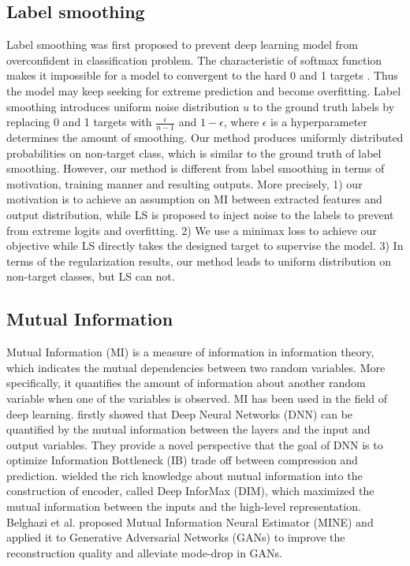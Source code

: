 \documentclass{article}
\theoremstyle{definition}
\begin{document}
\subsection{Label smoothing}
Label smoothing \cite{szegedy2016rethinking} was first proposed to prevent deep learning model from overconfident in classification problem. The characteristic of softmax function makes it impossible for a model to convergent to the hard 0 and 1 targets \cite{Goodfellow-et-al-2016}. Thus the model may keep seeking for extreme prediction and become overfitting. Label smoothing introduces uniform noise distribution $u$ to the ground truth labels by replacing 0 and 1 targets with $\frac{\epsilon}{n-1}$ and $1-\epsilon$, where $\epsilon$ is a hyperparameter determines the amount of smoothing. Our method produces uniformly distributed probabilities on non-target class, which is similar to the ground truth of label smoothing. However, our method is different from label smoothing in terms of motivation, training manner and resulting outputs. 
More precisely, 1) our motivation is to achieve an assumption on MI between extracted features and output distribution, while LS is proposed to inject noise to the labels to prevent from extreme logits and overfitting.
2) We use a minimax loss to achieve our objective while LS directly takes the designed target to supervise the model.
3) In terms of the regularization results, our method leads to uniform distribution on non-target classes, but LS can not.

\subsection{Mutual Information}
Mutual Information (MI) is a measure of information in information theory, which indicates the mutual dependencies between two random variables. More specifically, it quantifies the amount of information about another random variable when one of the variables is observed. 
MI has been used in the field of deep learning. 
\cite{tishby2015deep} firstly showed that Deep Neural Networks (DNN) can be quantified by the mutual information between the layers and the input and output variables. They provide a novel perspective that the goal of DNN is to optimize Information Bottleneck (IB) trade off between compression and prediction. 
\cite{hjelm2018learning} wielded the rich knowledge about mutual information into the construction of encoder, called Deep InforMax (DIM), which maximized the mutual information between the inputs and the high-level representation. Belghazi et al. \cite{belghazi2018mutual} proposed Mutual Information Neural Estimator (MINE) and applied it to Generative Adversarial Networks (GANs) 
\cite{goodfellow2014generative} to improve the reconstruction quality and alleviate mode-drop in GANs. 
\end{document}
